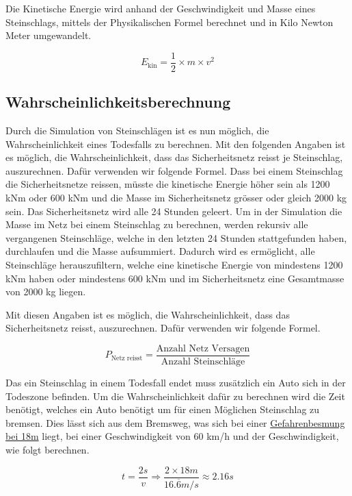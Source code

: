 \documentclass[
  letterpaper,
  DIV=11,
  numbers=noendperiod]{scrartcl}
\begin{document}
Die Kinetische Energie wird anhand der Geschwindigkeit und Masse eines
Steinschlags, mittels der Physikalischen Formel berechnet und in Kilo
Newton Meter umgewandelt.

\[
E_{\text{kin}} = \frac{1}{2} \times m \times v^{2}
\]\newline

\newpage

\subsection{Wahrscheinlichkeitsberechnung}\label{wahrscheinlichkeitsberechnung}

Durch die Simulation von Steinschlägen ist es nun möglich, die
Wahrscheinlichkeit eines Todesfalls zu berechnen. Mit den folgenden
Angaben ist es möglich, die Wahrscheinlichkeit, dass das Sicherheitsnetz
reisst je Steinschlag, auszurechnen. Dafür verwenden wir folgende
Formel. Dass bei einem Steinschlag die Sicherheitsnetze reissen, müsste
die kinetische Energie höher sein als 1200 kNm oder 600 kNm und die
Masse im Sicherheitsnetz grösser oder gleich 2000 kg sein. Das
Sicherheitsnetz wird alle 24 Stunden geleert. Um in der Simulation die
Masse im Netz bei einem Steinschlag zu berechnen, werden rekursiv alle
vergangenen Steinschläge, welche in den letzten 24 Stunden stattgefunden
haben, durchlaufen und die Masse aufsummiert. Dadurch wird es
ermöglicht, alle Steinschläge herauszufiltern, welche eine kinetische
Energie von mindestens 1200 kNm haben oder mindestens 600 kNm und im
Sicherheitsnetz eine Gesamtmasse von 2000 kg liegen.

Mit diesen Angaben ist es möglich, die Wahrscheinlichkeit, dass das
Sicherheitsnetz reisst, auszurechnen. Dafür verwenden wir folgende
Formel.

\[
P_{\text{Netz reisst}} = \frac{\text{Anzahl Netz Versagen}}{\text{Anzahl Steinschläge}} 
\]

Das ein Steinschlag in einem Todesfall endet muss zusätzlich ein Auto
sich in der Todeszone befinden. Um die Wahrscheinlichkeit dafür zu
berechnen wird die Zeit benötigt, welches ein Auto benötigt um für einen
Möglichen Steinschlag zu bremsen. Dies lässt sich aus dem Bremsweg, was
sich bei einer
\href{https://www.adac.de/verkehr/rund-um-den-fuehrerschein/erwerb/anhalteweg-berechnen/}{Gefahrenbesmung
bei 18m} liegt, bei einer Geschwindigkeit von 60 km/h und der
Geschwindigkeit, wie folgt berechnen.

\[
t = \frac{2s}{v} \Rightarrow \frac{2\times18m}{16.\overline{6}m/s} \approx 2.16s 
\]
\end{document}
